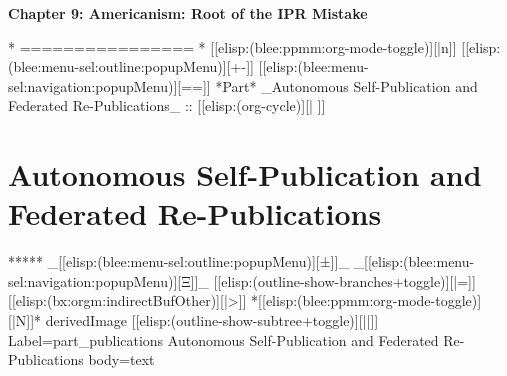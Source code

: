 \begin{whenOrg}
\begin{verblatex}
\begin{frame}[fragile,plain,label=citation_nonAmericanist]
    \bigskip

    \begin{center}
      \begin{large}
        \textbf{Chapter 9: Americanism: Root of the IPR Mistake}
      \end{large}
  \end{center}



\end{frame}
\end{verblatex}


\begin{whenOrg}
*      ================
*  [[elisp:(blee:ppmm:org-mode-toggle)][|n]] [[elisp:(blee:menu-sel:outline:popupMenu)][+-]] [[elisp:(blee:menu-sel:navigation:popupMenu)][==]]  *Part*   _Autonomous Self-Publication and Federated Re-Publications_ ::  [[elisp:(org-cycle)][| ]]
\end{whenOrg}

\newpage
\part{Autonomous Self-Publication and Federated Re-Publications}

\begin{whenOrg}
*****  _[[elisp:(blee:menu-sel:outline:popupMenu)][±]]_ _[[elisp:(blee:menu-sel:navigation:popupMenu)][Ξ]]_ [[elisp:(outline-show-branches+toggle)][|=]] [[elisp:(bx:orgm:indirectBufOther)][|>]] *[[elisp:(blee:ppmm:org-mode-toggle)][|N]]*  derivedImage [[elisp:(outline-show-subtree+toggle)][||]] Label=part_publications Autonomous Self-Publication and Federated Re-Publications body=text
\end{whenOrg}


\end{whenOrg}

